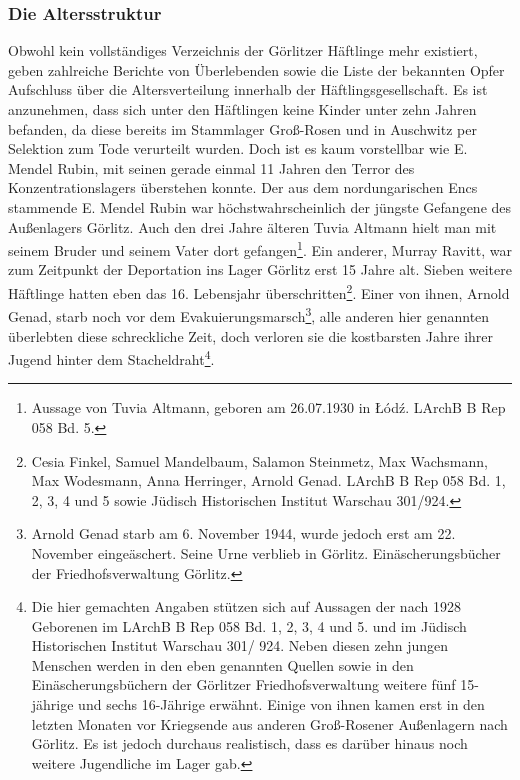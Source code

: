 \documentclass[a4paper,12pt,ngerman,
]{nisebook}
\begin{document}
\subsubsection{Die Altersstruktur}
Obwohl kein vollständiges Verzeichnis der Görlitzer Häftlinge mehr existiert, geben zahlreiche Berichte von Überlebenden sowie die Liste der bekannten Opfer Aufschluss über die Altersverteilung innerhalb der Häftlingsgesellschaft.
\newline
Es ist anzunehmen, dass sich unter den Häftlingen keine Kinder unter zehn Jahren befanden, da diese bereits im Stammlager Groß-Rosen und in Auschwitz per Selektion zum Tode verurteilt wurden.
Doch ist es kaum vorstellbar wie E. \mbox{Mendel} \mbox{Rubin}, mit seinen gerade einmal 11 Jahren den Terror des Konzentrationslagers überstehen konnte. Der aus dem nordungarischen Encs stammende E. Mendel Rubin war höchstwahrscheinlich der jüngste Gefangene des Außenlagers Görlitz. Auch den drei Jahre älteren Tuvia Altmann hielt man mit seinem Bruder und seinem Vater dort gefangen\footnote{Aussage von Tuvia Altmann, geboren am 26.07.1930 in \L \'od\'z. LArchB B Rep 058 Bd. 5.}. Ein anderer, Murray Ravitt, war zum Zeitpunkt der Deportation ins Lager Görlitz erst 15 Jahre alt. Sieben weitere Häftlinge hatten eben das 16. Lebensjahr überschritten\footnote{Cesia Finkel, Samuel Mandelbaum, Salamon Steinmetz, Max Wachsmann, Max Wodesmann, Anna Herringer, Arnold Genad. LArchB B Rep 058 Bd. 1, 2, 3, 4 und 5 sowie Jüdisch Historischen Institut Warschau 301/924.}. Einer von ihnen, Arnold Genad, starb noch vor dem Evakuierungsmarsch\footnote{Arnold Genad starb am 6. November 1944, wurde jedoch erst am 22. November eingeäschert. Seine Urne verblieb in Görlitz.  Einäscherungsbücher der Friedhofsverwaltung Görlitz.}, alle anderen hier genannten überlebten diese schreckliche Zeit, doch verloren sie die kostbarsten Jahre ihrer Jugend hinter dem Stacheldraht\footnote{Die hier gemachten Angaben stützen sich auf Aussagen der nach 1928 Geborenen im LArchB B Rep 058 Bd. 1, 2, 3, 4 und 5. und im Jüdisch Historischen Institut Warschau 301/ 924. Neben diesen zehn jungen Menschen werden in den eben genannten Quellen sowie in den Einäscherungsbüchern der Görlitzer Friedhofsverwaltung weitere fünf 15-jährige und sechs 16-Jährige erwähnt. Einige von ihnen kamen erst in den letzten Monaten vor Kriegsende aus anderen Groß-Rosener Außenlagern nach Görlitz. Es ist jedoch durchaus realistisch, dass es darüber hinaus noch weitere Jugendliche im Lager gab.}.
\end{document}
